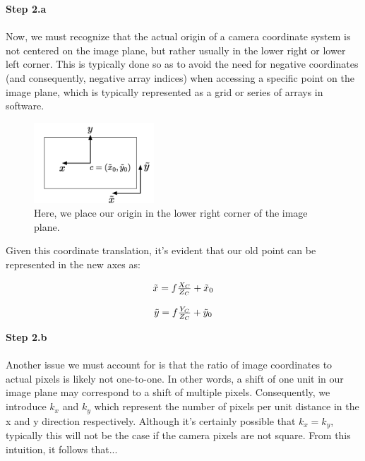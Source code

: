 \documentclass[]{article}
\begin{document}
\textbf{Step 2.a}\\\\
Now, we must recognize that the actual origin of a camera coordinate system is not centered on the image plane, but rather usually in the lower right or lower left corner. This is typically done so as to avoid the need for negative coordinates (and consequently, negative array indices) when accessing a specific point on the image plane, which is typically represented as a grid or series of arrays in software.

\begin{figure}[H]
\includegraphics[width=0.4\textwidth]{vik_image_2.png}
\centering
\caption{Here, we place our origin in the lower right corner of the image plane. }
\label{fig:camera_coordinates}
\end{figure}

Given this coordinate translation, it's evident that our old point can be represented in the new axes as:

\begin{center}
\begin{equation}
\begin{tabular}{c}
  $\tilde{x} = f\frac{X_C}{Z_C} + \tilde{x}_0$\\
  \\
  $\tilde{y} = f\frac{Y_C}{Z_C} + \tilde{y}_0$
\end{tabular}
\end{equation}
\end{center}

\textbf{Step 2.b}\\\\
Another issue we must account for is that the ratio of image coordinates to actual pixels is likely not one-to-one. In other words, a shift of one unit in our image plane may correspond to a shift of multiple pixels. Consequently, we introduce $k_x$ and $k_y$ which represent the number of pixels per unit distance in the x and y direction respectively. Although it's certainly possible that $k_x = k_y$, typically this will not be the case if the camera pixels are not square. From this intuition, it follows that...
\end{document}
